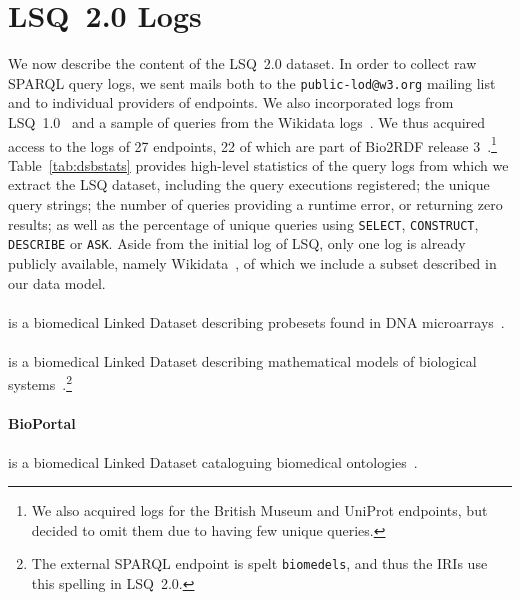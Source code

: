 \section{LSQ~2.0 Logs}\label{sec:logs}

We now describe the content of the LSQ~2.0 dataset. In order to collect raw SPARQL query logs, we sent mails both to the \texttt{public-lod@w3.org} mailing list and to individual providers of endpoints. We also incorporated logs from LSQ~1.0~\cite{SaleemAHMN15} and a sample of queries from the Wikidata logs~\cite{MalyshevKGGB18}. We thus acquired access to the logs of 27 endpoints, 22 of which are part of Bio2RDF release 3~\cite{DumontierCCAEBD14}.\footnote{We also acquired logs for the British Museum and UniProt endpoints, but decided to omit them due to having few unique queries.} Table~\ref{tab:dsbstats} provides high-level statistics of the query logs from which we extract the LSQ dataset, including the query executions registered; the unique query strings; the number of queries providing a runtime error, or returning zero results; as well as the percentage of unique queries using \texttt{SELECT}, \texttt{CONSTRUCT}, \texttt{DESCRIBE} or \texttt{ASK}. Aside from the initial log of LSQ, only one log is already publicly available, namely Wikidata~\cite{MalyshevKGGB18}, of which we include a subset described in our data model.


  
\paragraph{\affymetrix} is a biomedical Linked Dataset describing probesets found in DNA microarrays~\cite{DumontierCCAEBD14}.

\paragraph{\biomodels} is a biomedical Linked Dataset describing mathematical models of biological systems~\cite{DumontierCCAEBD14}.\footnote{The external SPARQL endpoint is spelt \texttt{biomedels}, and thus the IRIs use this spelling in LSQ~2.0.}

\paragraph{BioPortal} is a biomedical Linked Dataset cataloguing biomedical ontologies~\cite{DumontierCCAEBD14}.

